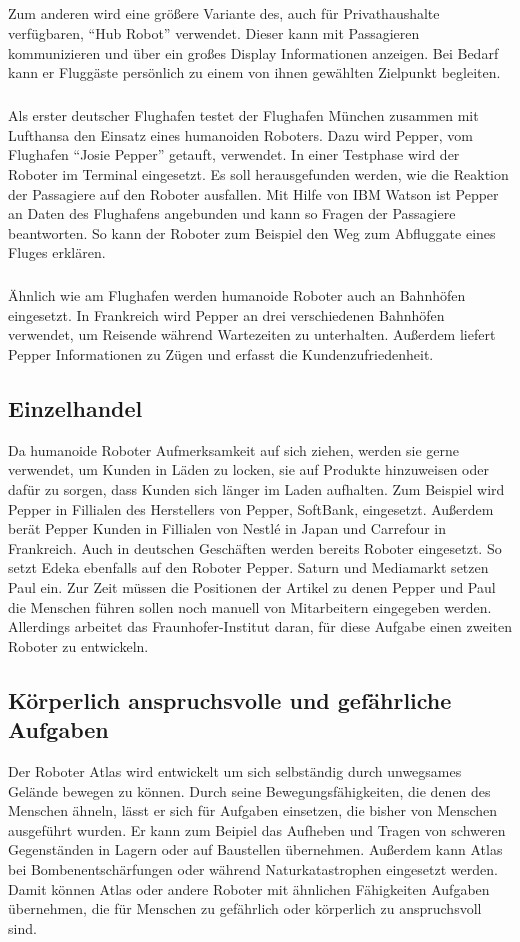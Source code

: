 \subparagraph{}
Zum anderen wird eine größere Variante des, auch für Privathaushalte
verfügbaren, "`Hub Robot"' verwendet. Dieser kann mit Passagieren kommunizieren
und über ein großes Display Informationen anzeigen. Bei Bedarf kann er Fluggäste
persönlich zu einem von ihnen gewählten Zielpunkt begleiten.
\cite{Beineke2017}

\subparagraph{}
Als erster deutscher Flughafen testet der Flughafen München zusammen mit
Lufthansa den Einsatz eines humanoiden Roboters. Dazu wird Pepper, vom Flughafen
"`Josie Pepper"' getauft, verwendet. In einer Testphase wird der Roboter im
Terminal eingesetzt. Es soll herausgefunden werden, wie die Reaktion der
Passagiere auf den Roboter ausfallen. Mit Hilfe von IBM Watson ist Pepper an
Daten des Flughafens angebunden und kann so Fragen der Passagiere beantworten.
So kann der Roboter zum Beispiel den Weg zum Abfluggate eines Fluges erklären.
\cite{MunichAirport2018}

\subparagraph{}
Ähnlich wie am Flughafen werden humanoide Roboter auch an Bahnhöfen eingesetzt.
In Frankreich wird Pepper an drei verschiedenen Bahnhöfen verwendet, um Reisende
während Wartezeiten zu unterhalten. Außerdem liefert Pepper Informationen zu
Zügen und erfasst die Kundenzufriedenheit. \cite{SoftBankIV2018}

\subsection{Einzelhandel}
Da humanoide Roboter Aufmerksamkeit auf sich ziehen, werden sie gerne verwendet,
um Kunden in Läden zu locken, sie auf Produkte hinzuweisen oder dafür zu sorgen,
dass Kunden sich länger im Laden aufhalten. Zum Beispiel wird Pepper in
Fillialen des Herstellers von Pepper, SoftBank, eingesetzt. Außerdem berät
Pepper Kunden in Fillialen von Nestlé in Japan und Carrefour in Frankreich.
\cite{SoftBankIV2018} Auch in deutschen Geschäften werden bereits Roboter
eingesetzt. So setzt Edeka ebenfalls auf den Roboter Pepper. Saturn und
Mediamarkt setzen Paul ein. Zur Zeit
müssen die Positionen der Artikel zu denen Pepper und Paul die Menschen führen
sollen noch manuell von Mitarbeitern eingegeben werden. Allerdings arbeitet das
Fraunhofer-Institut daran, für diese Aufgabe einen zweiten Roboter zu
entwickeln. \cite{Hildebrand2017}

\subsection{Körperlich anspruchsvolle und gefährliche Aufgaben}
Der Roboter Atlas wird entwickelt um sich selbständig durch unwegsames Gelände
bewegen zu können. Durch seine Bewegungsfähigkeiten, die denen des Menschen
ähneln, lässt er sich für Aufgaben einsetzen, die bisher von Menschen ausgeführt
wurden. Er kann zum Beipiel das Aufheben
und Tragen von schweren Gegenständen in Lagern oder auf Baustellen übernehmen.
Außerdem kann Atlas bei Bombenentschärfungen oder während Naturkatastrophen
eingesetzt werden. Damit können Atlas oder andere Roboter mit ähnlichen
Fähigkeiten Aufgaben übernehmen, die für Menschen zu gefährlich oder körperlich
zu anspruchsvoll sind. \cite{Kaczmarek2016}

